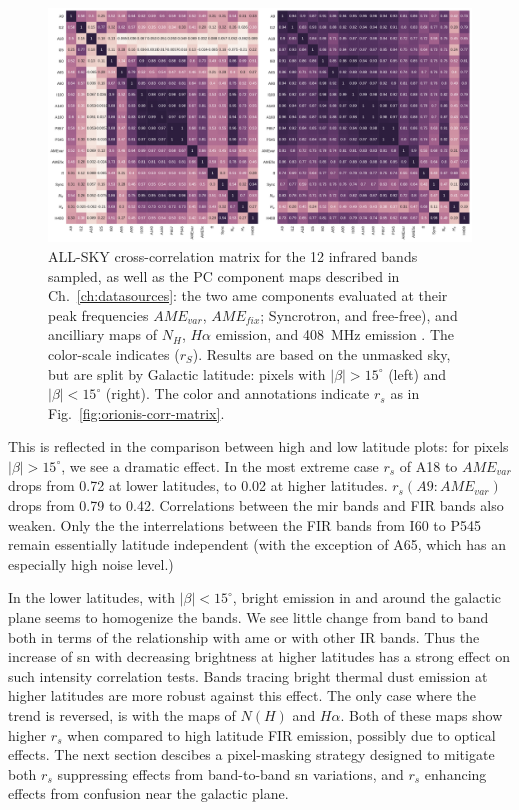           \begin{figure}
            \includegraphics[width=\textwidth]{../Plots/ch_allsky/all_bands_corr_matrix_wAME_spearmanintensity_unmasked.pdf}
            \centering
            \caption{ALL-SKY cross-correlation matrix for the 12 infrared bands sampled, as well as the PC component maps described in Ch.~\ref{ch:datasources}: the two \gls{ame} components evaluated at their peak frequencies $AME_{var}$, $AME_{fix}$; Syncrotron, and free-free), and ancilliary maps of $N_{H}$, $H{\alpha}$ emission, and 408~MHz emission \cite{haslam82}. The color-scale indicates ($r_{S}$). Results are based on the unmasked sky, but are split by Galactic latitude: pixels with $|\beta{}| > 15^{\circ}$ (left) and $|\beta{}| < 15^{\circ}$ (right). The color and annotations indicate $r_{s}$ as in Fig.~\ref{fig:orionis-corr-matrix}. }
            \label{fig:all_bands_corr_matrix_wAME_spearman}
          \end{figure}
       This is reflected in the comparison between high and low latitude plots: for pixels $|\beta| > 15 ^{\circ}$, we see a dramatic effect. In the most extreme case $r_{s}$ of A18 to $AME_{var}$ drops from 0.72 at lower latitudes, to 0.02 at higher latitudes. $r_{s}(A9:AME_{var})$ drops from 0.79 to 0.42. Correlations between the \gls{mir} bands and FIR bands also weaken. Only the the interrelations between the FIR bands from I60 to P545 remain essentially latitude independent (with the exception of A65, which has an especially high noise level.)

        In the lower latitudes, with $|\beta| < 15^{\circ}$, bright emission in and around the galactic plane seems to homogenize the bands. We see little change from band to band both in terms of the relationship with \gls{ame} or with other IR bands. Thus the increase of \gls{sn} with decreasing brightness at higher latitudes has a strong effect on such intensity correlation tests. Bands tracing bright thermal dust emission at higher latitudes are more robust against this effect. The only case where the trend is reversed, is with the maps of $N(H)$ and $H{\alpha}$. Both of these maps show higher $r_{s}$ when compared to high latitude FIR emission, possibly due to optical effects. The next section descibes a pixel-masking strategy designed to mitigate both $r_{s}$ suppressing effects from band-to-band \gls{sn} variations, and $r_{s}$ enhancing effects from confusion near the galactic plane.

